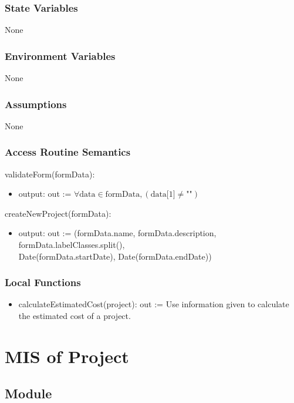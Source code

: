 \documentclass[12pt, titlepage]{article}
\begin{document}
\subsubsection{State Variables}
None

\subsubsection{Environment Variables}
None

\subsubsection{Assumptions}
None

\subsubsection{Access Routine Semantics}

\noindent validateForm(formData):
\begin{itemize}
\item output: out := $\forall \text{data} \in \text{formData}, (\text{data[1]} \neq \text{""})$
\end{itemize}

\noindent createNewProject(formData):
\begin{itemize}
\item output: out := 
    (formData.name, formData.description, formData.labelClasses.split(), \\ Date(formData.startDate), Date(formData.endDate))
\end{itemize}

\subsubsection{Local Functions}
\begin{itemize}
    \item calculateEstimatedCost(project): out := Use information given to calculate the estimated cost of a project.
\end{itemize}

\section{MIS of Project} \label{project}

\subsection{Module}
\end{document}
